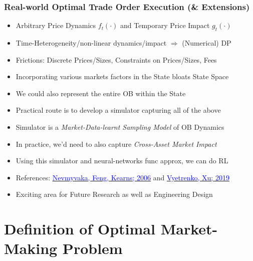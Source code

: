 \documentclass[handout]{beamer}
\begin{document}
\begin{frame}
\frametitle{Real-world Optimal Trade Order Execution (\& Extensions)}
\pause
\begin{itemize}[<+->]
\item Arbitrary Price Dynamics $f_t(\cdot)$ and Temporary Price Impact $g_t(\cdot)$
\item Time-Heterogeneity/non-linear dynamics/impact $\Rightarrow$ (Numerical) DP
\item Frictions: Discrete Prices/Sizes, Constraints on Prices/Sizes, Fees
\item Incorporating various markets factors in the State bloats State Space
\item We could also represent the entire OB within the State
\item Practical route is to develop a simulator capturing all of the above
\item Simulator is a {\em Market-Data-learnt Sampling Model} of OB Dynamics 
\item In practice, we'd need to also capture {\em Cross-Asset Market Impact}
\item Using this simulator and neural-networks func approx, we can do RL
\item References: \href{https://www.cis.upenn.edu/~mkearns/papers/rlexec.pdf}{\underline{\textcolor{blue}{Nevmyvaka, Feng, Kearns; 2006}}} and \href{https://arxiv.org/pdf/1906.02312.pdf}{\underline{\textcolor{blue}{Vyetrenko, Xu; 2019}}}
\item Exciting area for Future Research as well as Engineering Design
\end{itemize}
\end{frame}

\section{Definition of Optimal Market-Making Problem}
\end{document}
